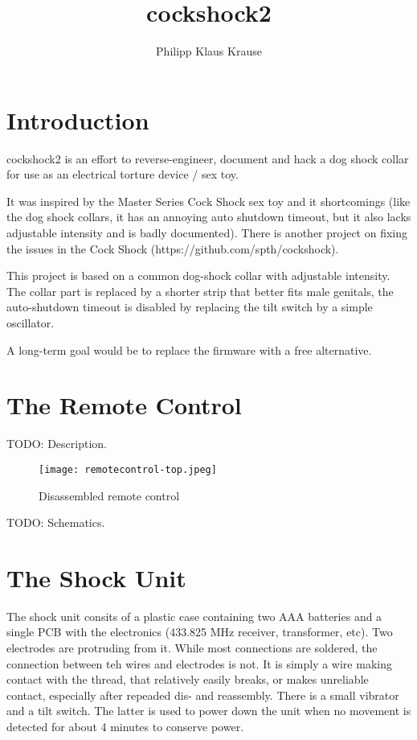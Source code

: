 \documentclass[a4paper]{article}
\begin{document}
\title{cockshock2}
\author{Philipp Klaus Krause}

\maketitle

\section{Introduction}

cockshock2 is an effort to reverse-engineer, document and hack a dog shock collar for use as an electrical torture device / sex toy.

It was inspired by the Master Series Cock Shock sex toy and it shortcomings (like the dog shock collars, it has an annoying auto shutdown timeout, but it also lacks adjustable intensity and is badly documented). There is another project on fixing the issues in the Cock Shock (https://github.com/spth/cockshock).

This project is based on a common dog-shock collar with adjustable intensity. The collar part is replaced by a shorter strip that better fits male genitals, the auto-shutdown timeout is disabled by replacing the tilt switch by a simple oscillator.

A long-term goal would be to replace the firmware with a free alternative.

\section{The Remote Control}

TODO: Description.

\begin{figure}
	\centerline{\texttt{[image: remotecontrol-top.jpeg]}}
	\caption{\label{remotepcb}Disassembled remote control}
\end{figure}

TODO: Schematics.

\section{The Shock Unit}

The shock unit consits of a plastic case containing two AAA batteries and a single PCB with the electronics (433.825 MHz receiver, transformer, etc). Two electrodes are protruding from it. While most connections are soldered, the connection between teh wires and electrodes is not. It is simply a wire making contact with the thread, that relatively easily breaks, or makes unreliable contact, especially after repeaded dis- and reassembly. There is a small vibrator and a tilt switch. The latter is used to power down the unit when no movement is detected for about 4 minutes to conserve power.
\end{document}

